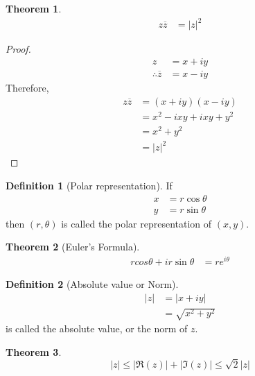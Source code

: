 \documentclass[fleqn, a4paper, 12pt, twoside]{article}
\theoremstyle{definition}
\newtheorem{definition}{Definition}
\theoremstyle{theorem}
\newtheorem{theorem}{Theorem}
\begin{document}
\begin{theorem}
	\begin{align*}
		z \overline{z} & = |z|^2
	\end{align*}
\end{theorem}

\begin{proof}
	\begin{align*}
		z                       & = x + i y \\
		\therefore \overline{z} & = x - i y
	\end{align*}
	Therefore,
	\begin{align*}
		z \overline{z} & = (x + i y) (x - i y)       \\
                               & = x^2 - i x y + i x y + y^2 \\
                               & = x^2 + y^2                 \\
                               & = |z|^2
	\end{align*}
\end{proof}

\begin{definition}[Polar representation]
	If
	\begin{align*}
		x & = r \cos \theta \\
		y & = r \sin \theta
	\end{align*}
	then $(r,\theta)$ is called the polar representation of $(x,y)$.
\end{definition}

\begin{theorem}[Euler's Formula]
	\begin{align*}
		r cos \theta + i r \sin \theta & = r e^{i \theta}
	\end{align*}
	\label{Euler's_Formula}
\end{theorem}

\begin{definition}[Absolute value or Norm]
	\begin{align*}
		|z| & = |x + i y| \\
                    & = \sqrt{x^2 + y^2}
	\end{align*}
	is called the absolute value, or the norm of $z$.
\end{definition}

\begin{theorem}
	\begin{equation*}
		|z| \le \left| \Re(z) \right| + \left| \Im(z) \right| \le \sqrt{2} |z|
	\end{equation*}
\end{theorem}
\end{document}
